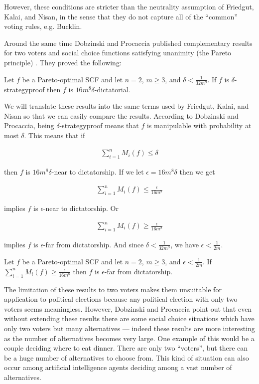 	However, these conditions are stricter than the neutrality assumption of Friedgut, Kalai, and Nisan, in the sense that they do not capture all of the ``common'' voting rules, e.g. Bucklin.

	Around the same time Dobzinski and Procaccia published complementary results for two voters and social choice functions satisfying unanimity (the Pareto principle) \cite{dobzinski2008frequent}. They proved the following:

	\begin{theorem}
		Let $f$ be a Pareto-optimal SCF and let $n = 2$, $m \ge 3$, and $\delta < \frac{1}{32m^9}$. If $f$ is $\delta$-strategyproof then $f$ is $16m^8 \delta$-dictatorial.
	\end{theorem}

	We will translate these results into the same terms used by Friedgut, Kalai, and Nisan so that we can easily compare the results. According to Dobzinski and Procaccia, being $\delta$-strategyproof means that $f$ is manipulable with probability at most $\delta$. This means that if

	\begin{align*}
		\sum_{i=1}^n M_i(f) \le \delta
	\end{align*}

	then $f$ is $16m^8 \delta$-near to dictatorship. If we let $\epsilon = 16m^8 \delta$ then we get

	\begin{align*}
		\sum_{i=1}^n M_i(f) \le \frac{\epsilon}{16m^8}
	\end{align*}

	implies $f$ is $\epsilon$-near to dictatorship. Or

	\begin{align*}
		\sum_{i=1}^n M_i(f) \ge \frac{\epsilon}{16m^8}
	\end{align*}

	implies $f$ is $\epsilon$-far from dictatorship. And since $\delta < \frac{1}{32m^9}$, we have $\epsilon < \frac{1}{2m}$.

	\begin{theorem}
		Let $f$ be a Pareto-optimal SCF and let $n = 2$, $m \ge 3$, and $\epsilon < \frac{1}{2m}$. If $\sum_{i=1}^n M_i(f) \ge \frac{\epsilon}{16m^8}$ then $f$ is $\epsilon$-far from dictatorship.
	\end{theorem}

	The limitation of these results to two voters makes them unsuitable for application to political elections because any political election with only two voters seems meaningless. However, Dobzinski and Procaccia point out that even without extending these results there are some social choice situations which have only two voters but many alternatives --- indeed these results are more interesting as the number of alternatives becomes very large. One example of this would be a couple deciding where to eat dinner. There are only two ``voters'', but there can be a huge number of alternatives to choose from. This kind of situation can also occur among artificial intelligence agents deciding among a vast number of alternatives.


